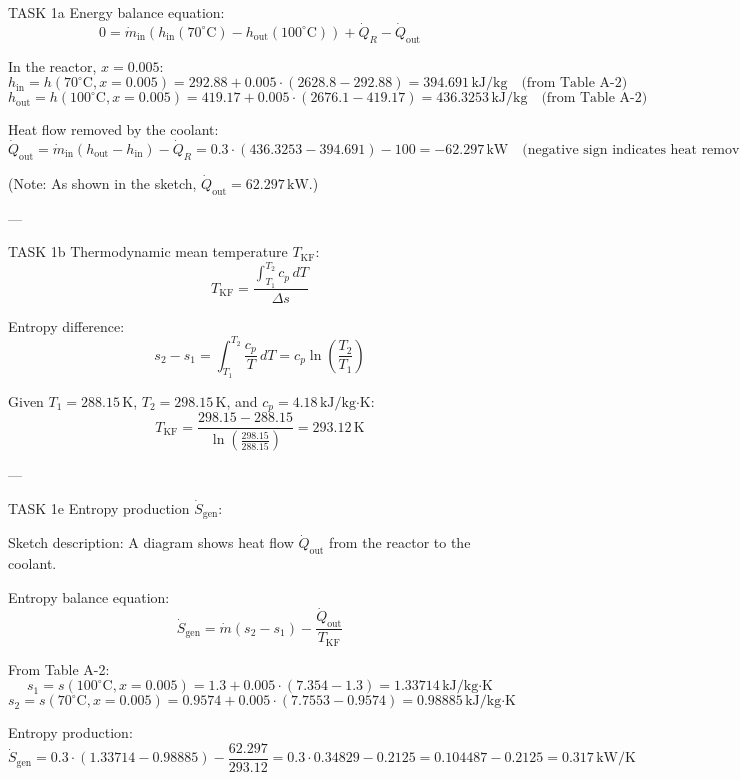 TASK 1a  
Energy balance equation:  
\[
0 = \dot{m}_{\text{in}} \left( h_{\text{in}}(70^\circ\text{C}) - h_{\text{out}}(100^\circ\text{C}) \right) + \dot{Q}_R - \dot{Q}_{\text{out}}
\]  

In the reactor, \( x = 0.005 \):  
\[
h_{\text{in}} = h(70^\circ\text{C}, x=0.005) = 292.88 + 0.005 \cdot (2628.8 - 292.88) = 394.691 \, \text{kJ/kg} \quad \text{(from Table A-2)}
\]  
\[
h_{\text{out}} = h(100^\circ\text{C}, x=0.005) = 419.17 + 0.005 \cdot (2676.1 - 419.17) = 436.3253 \, \text{kJ/kg} \quad \text{(from Table A-2)}
\]  

Heat flow removed by the coolant:  
\[
\dot{Q}_{\text{out}} = \dot{m}_{\text{in}} \left( h_{\text{out}} - h_{\text{in}} \right) - \dot{Q}_R = 0.3 \cdot (436.3253 - 394.691) - 100 = -62.297 \, \text{kW} \quad \text{(negative sign indicates heat removed)}
\]  

(Note: As shown in the sketch, \( \dot{Q}_{\text{out}} = 62.297 \, \text{kW} \).)  

---

TASK 1b  
Thermodynamic mean temperature \( T_{\text{KF}} \):  
\[
T_{\text{KF}} = \frac{\int_{T_1}^{T_2} c_p \, dT}{\Delta s}
\]  

Entropy difference:  
\[
s_2 - s_1 = \int_{T_1}^{T_2} \frac{c_p}{T} \, dT = c_p \ln \left( \frac{T_2}{T_1} \right)
\]  

Given \( T_1 = 288.15 \, \text{K} \), \( T_2 = 298.15 \, \text{K} \), and \( c_p = 4.18 \, \text{kJ/kg·K} \):  
\[
T_{\text{KF}} = \frac{298.15 - 288.15}{\ln \left( \frac{298.15}{288.15} \right)} = 293.12 \, \text{K}
\]  

---

TASK 1e  
Entropy production \( \dot{S}_{\text{gen}} \):  

Sketch description: A diagram shows heat flow \( \dot{Q}_{\text{out}} \) from the reactor to the coolant.  

Entropy balance equation:  
\[
\dot{S}_{\text{gen}} = \dot{m} \left( s_2 - s_1 \right) - \frac{\dot{Q}_{\text{out}}}{T_{\text{KF}}}
\]  

From Table A-2:  
\[
s_1 = s(100^\circ\text{C}, x=0.005) = 1.3 + 0.005 \cdot (7.354 - 1.3) = 1.33714 \, \text{kJ/kg·K}
\]  
\[
s_2 = s(70^\circ\text{C}, x=0.005) = 0.9574 + 0.005 \cdot (7.7553 - 0.9574) = 0.98885 \, \text{kJ/kg·K}
\]  

Entropy production:  
\[
\dot{S}_{\text{gen}} = 0.3 \cdot (1.33714 - 0.98885) - \frac{62.297}{293.12} = 0.3 \cdot 0.34829 - 0.2125 = 0.104487 - 0.2125 = 0.317 \, \text{kW/K}
\]